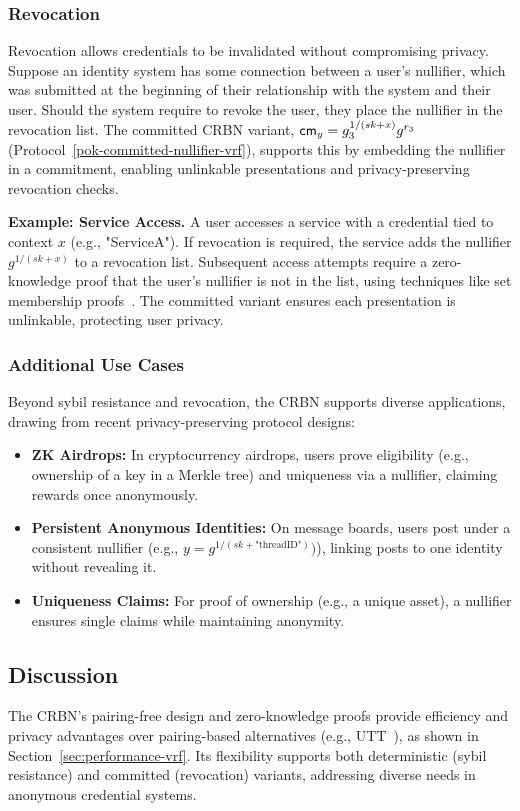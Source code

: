\subsubsection{Revocation}\label{subsubsec:revocation}
Revocation allows credentials to be invalidated without compromising privacy. Suppose an identity system has some connection between a user's nullifier, which was submitted at the beginning of their relationship with the system and their user. Should the system require to revoke the user, they place the nullifier in the revocation list. The committed CRBN variant, $\mathsf{cm}_y = g_3^{1/(sk + x)} g^{r_3}$ (Protocol~\ref{pok-committed-nullifier-vrf}), supports this by embedding the nullifier in a commitment, enabling unlinkable presentations and privacy-preserving revocation checks.

\textbf{Example: Service Access.} A user accesses a service with a credential tied to context $x$ (e.g., "ServiceA"). If revocation is required, the service adds the nullifier $g^{1/(sk + x)}$ to a revocation list. Subsequent access attempts require a zero-knowledge proof that the user’s nullifier is not in the list, using techniques like set membership proofs~\cite{goos_dynamic_2002}. The committed variant ensures each presentation is unlinkable, protecting user privacy.

\subsubsection{Additional Use Cases}\label{subsubsec:other-applications}
Beyond sybil resistance and revocation, the CRBN supports diverse applications, drawing from recent privacy-preserving protocol designs:

\begin{itemize}
    \item \textbf{ZK Airdrops:} In cryptocurrency airdrops, users prove eligibility (e.g., ownership of a key in a Merkle tree) and uniqueness via a nullifier, claiming rewards once anonymously.
    \item \textbf{Persistent Anonymous Identities:} On message boards, users post under a consistent nullifier (e.g., $y = g^{1/(sk + \text{"threadID"})})$), linking posts to one identity without revealing it.
    \item \textbf{Uniqueness Claims:} For proof of ownership (e.g., a unique asset), a nullifier ensures single claims while maintaining anonymity.
\end{itemize}

\subsection{Discussion}
The CRBN’s pairing-free design and zero-knowledge proofs provide efficiency and privacy advantages over pairing-based alternatives (e.g., UTT~\cite{tomescu_utt_2022}), as shown in Section~\ref{sec:performance-vrf}. Its flexibility supports both deterministic (sybil resistance) and committed (revocation) variants, addressing diverse needs in anonymous credential systems.

